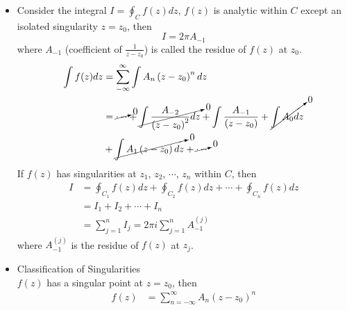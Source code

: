 \begin{itemize}
\item Consider the integral
$\displaystyle I = \oint_Cf(z)dz$, $f(z)$ is analytic within $C$ except an isolated singularity $z=z_0$, then 
\begin{equation}
I = 2\pi A_{-1}
\label{eq: 5-1-16}
\end{equation}
where $A_{-1}$ (coefficient of $\displaystyle\frac{1}{z-z_0}$) is called the residue of $f(z)$ at $z_0$.
\begin{align*}
\int f(z)dz 
&= \sum_{-\infty}^{\infty}\int A_n\left(z-z_0\right)^n dz\\ 
&= \cancelto{0}{\cdots} + \cancelto{0}{\int \frac{A_{-2}}{\left(z-z_0\right)^2} dz} + \int \frac{A_{-1}}{\left(z-z_0\right)} + \cancelto{0}{\int A_0 dz} \\ 
&+ \cancelto{0}{\int A_1\left(z-z_0\right) dz} + \cancelto{0}{\cdots}
\end{align*}
If $f(z)$ has singularities at $z_1$, $z_2$, $\cdots$, $z_n$ within $C$, then
\begin{align*}
I
&= \oint_{C_1}f(z)dz + \oint_{C_2}f(z)dz + \cdots + \oint_{C_n}f(z)dz \\
&= I_1 + I_2 + \cdots + I_n \\
&= \sum_{j=1}^nI_j = 2\pi i\sum_{j=1}^nA_{-1}^{(j)}
\end{align*}
where $A_{-1}^{(j)}$ is the residue of $f(z)$ at $z_j$.\\
\vspace{2em}
\begin{center}
\end{center}
\vspace{3em}
\item Classification of Singularities\\
$f(z)$ has a singular point at $z=z_0$, then
\begin{align*}
f(z)
&= \sum_{n=-\infty}^{\infty}A_n\left(z-z_0\right)^n \\

\end{align*}
\end{itemize}
